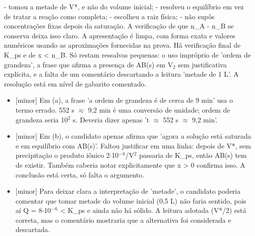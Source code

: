 \documentclass{article}%
\begin{document}
{-} tomou a metade de V*, e não do volume inicial;\newline%
{-} resolveu o equilíbrio em vez de tratar a reação como completa;\newline%
{-} escolheu a raiz física;\newline%
{-} não supôs concentrações fixas depois da saturação. A verificação de que n\_A - n\_B se conserva deixa isso claro.\newline%
\newline%
A apresentação é limpa, com forma exata e valores numéricos usando as aproximações fornecidas na prova. Há verificação final de K\_ps e de x < n\_B. Só restam ressalvas pequenas: o uso impróprio de 'ordem de grandeza', a frase que afirma a presença de AB(s) em V$_{2}$ sem justificativa explícita, e a falta de um comentário descartando a leitura 'metade de 1 L'. A resolução está em nível de gabarito comentado.%
\begin{itemize}%
\item%
{[}minor{]} Em (a), a frase 'a ordem de grandeza é de cerca de 9 min' usa o termo errado. 552 s $\approx$ 9,2 min é uma conversão de unidade; ordem de grandeza seria 10$^2$ s. Deveria dizer apenas 't $\approx$ 552 s $\approx$ 9,2 min'.%
\item%
{[}minor{]} Em (b), o candidato apenas afirma que 'agora a solução está saturada e em equilíbrio com AB(s)'. Faltou justificar em uma linha: depois de V*, sem precipitação o produto iônico 2$\cdot$10$^{-}$$^{6}$/V$^2$ passaria de K\_ps, então AB(s) tem de existir. Também caberia notar explicitamente que x > 0 confirma isso. A conclusão está certa, só falta o argumento.%
\item%
{[}minor{]} Para deixar clara a interpretação de 'metade', o candidato poderia comentar que tomar metade do volume inicial (0,5 L) não faria sentido, pois aí Q = 8$\cdot$10$^{-}$$^{6}$ < K\_ps e ainda não há sólido. A leitura adotada (V*/2) está correta, mas o comentário mostraria que a alternativa foi considerada e descartada.%
\end{itemize}%
\end{document}
